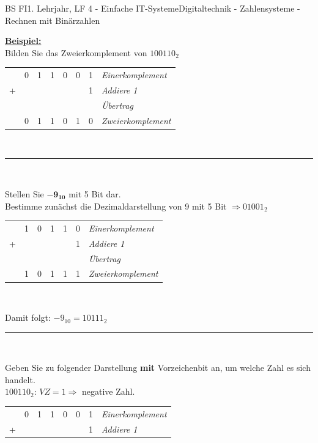 \documentclass[11pt,twocolumn,oneside,openany,headings=optiontotoc,11pt,numbers=noenddot]{article}
\begin{document}
\begin{worksheet}{BS FI}{1. Lehrjahr, LF 4 - Einfache IT-Systeme}{Digitaltechnik - Zahlensysteme - Rechnen mit Binärzahlen}
		\par\noindent
		\textbf{\underline{Beispiel:}}\\
		Bilden Sie das Zweierkomplement von \(100110_2\)\\
		\begin{tabularx}{0.48\textwidth}{rllllll|l}
			& 0 & 1 & 1 & 0 & 0 & 1 & \textit{Einerkomplement}\\
			+ & & & & & & 1 & \textit{Addiere 1}\\
			& & & & &  \color{codegray}{\tiny{1}} & & \textit{\tiny{Übertrag}}\normalsize\\
			\cline{1-8}
			& 0 & 1 & 1 & 0 & 1 & 0 & \textit{Zweierkomplement}
		\end{tabularx}\\
		\par\noindent
		\rule{0.48\textwidth}{0.1pt}\\
		\par\noindent
		Stellen Sie \(\mathbf{-9_{10}}\) mit 5 Bit dar.\\
		Bestimme zunächst die Dezimaldarstellung von 9 mit 5 Bit \(\Rightarrow 01001_2\)\\
		\par\noindent
		\begin{tabularx}{0.48\textwidth}{rlllll|l}
			& 1 & 0 & 1 & 1 & 0 & \textit{Einerkomplement}\\
			+ & & & & & 1 & \textit{Addiere 1}\\
			& & & & & & \textit{\tiny{Übertrag}}\normalsize\\
			\cline{1-7}
			& 1 & 0 & 1 & 1 & 1 & \textit{Zweierkomplement}
		\end{tabularx}\\
		\par\noindent
		Damit folgt: \(-9_{10} = 10111_{2}\)\\
		\par\noindent
		\rule{0.48\textwidth}{0.1pt}\\
		\par\noindent
		Geben Sie zu folgender Darstellung \textbf{mit} Vorzeichenbit an, um welche Zahl es sich handelt.\\
		\colorbox{green!10}{\(1\)}\(00110_{2}\): \(VZ = 1 \Rightarrow \) negative Zahl.\\
		\par\noindent
		\begin{tabularx}{0.48\textwidth}{rllllll|l}
			& 0 & 1 & 1 & 0 & 0 & 1 & \textit{Einerkomplement}\\
			+ & & & & & & 1 & \textit{Addiere 1}\\

\end{tabularx}
\end{worksheet}
\end{document}
